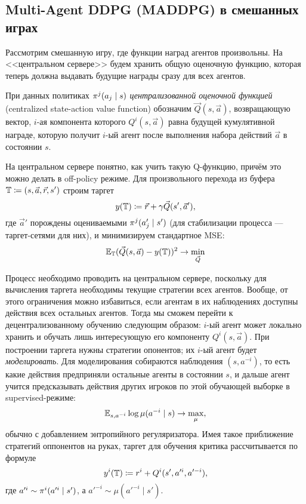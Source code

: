 \subsection{Multi-Agent DDPG (MADDPG) в смешанных играх}

Рассмотрим смешанную игру, где функции наград агентов произвольны. На <<центральном сервере>> будем хранить общую оценочную функцию, которая теперь должна выдавать будущие награды сразу для всех агентов. 

\begin{definition}
При данных политиках $\pi^j(a_j \HM\mid s)$ \emph{централизованной оценочной функцией} (centralized state-action value function)  обозначим $\vec{Q}(s, \vec{a})$, возвращающую вектор, $i$-ая компонента которого $Q^i(s, \vec{a})$ равна будущей кумулятивной награде, которую получит $i$-ый агент после выполнения набора действий $\vec{a}$ в состоянии $s$.
\end{definition}

На центральном сервере понятно, как учить такую Q-функцию, причём это можно делать в off-policy режиме. Для произвольного перехода из буфера $\mathbb{T} \coloneqq (s, \vec{a}, \vec{r}, s')$ строим таргет
$$y(\mathbb{T}) \coloneqq \vec{r} + \gamma \vec{Q}(s', \vec{a}'),$$
где $\vec{a}'$ порождены оцениваемыми $\pi^j(a'_j \HM\mid s')$ (для стабилизации процесса --- таргет-сетями для них), и минимизируем стандартное MSE:
$$\mathbb{E}_{\mathbb{T}} (\vec{Q}(s, \vec{a}) - y(\mathbb{T}))^2 \to \min_{\vec{Q}}$$

Процесс необходимо проводить на центральном сервере, поскольку для вычисления таргета необходимы текущие стратегии всех агентов. Вообще, от этого ограничения можно избавиться, если агентам в их наблюдениях доступны действия всех остальных агентов. Тогда мы сможем перейти к децентрализованному обучению следующим образом: $i$-ый агент может локально хранить и обучать лишь интересующую его компоненту $Q^i(s, \vec{a})$. При построении таргета нужны стратегии опонентов; их $i$-ый агент будет \emph{моделировать}. Для моделирования собираются наблюдения $(s, a^{-i})$, то есть какие действия предприняли остальные агенты в состоянии $s$, и дальше агент учится предсказывать действия других игроков по этой обучающей выборке в supervised-режиме:
$$\mathbb{E}_{s, a^{-i}} \log \mu(a^{-i} \mid s) \to \max_{\mu},$$
обычно с добавлением энтропийного регуляризатора. Имея такое приближение стратегий оппонентов на руках, таргет для обучения критика рассчитывается по формуле
$$y^i(\mathbb{T}) \coloneqq r^i + Q^i(s', a'^i, a'^{-i}),$$
где $a'^i \HM\sim \pi^i(a'^i \mid s')$, а $a'^{-i} \sim \mu(a'^{-i} \mid s')$.

